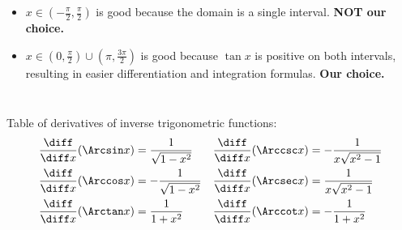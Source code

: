 \begin{frame}
\begin{columns}
\begin{itemize}
\item<6-> $x\in \left(-\frac{\pi}{2}, \frac{\pi}{2} \right) $ is good because the domain is a single interval. \textbf{NOT our choice.}

\item<7,8,9,10-> $x\in \left(0, \frac{\pi}{2} \right) \cup \left(\pi,\frac{3\pi}{2} \right) $ is  good because $\tan x$ is positive on both intervals, resulting in easier differentiation and integration formulas. \textbf{Our choice.} 

\end{itemize}
\end{columns}

\end{frame}

\begin{frame}
Table of derivatives of inverse trigonometric functions: 
\begin{align*}
\frac{\diff}{\diff x} (\Arcsin x) & = %
\frac{1}{\sqrt{1-x^2}} &%
\frac{\diff}{\diff x} (\Arccsc x) & = %
-\frac{1}{x\sqrt{x^2-1}} \\%
\frac{\diff}{\diff x} (\Arccos x) & = %
-\frac{1}{\sqrt{1-x^2}} &%
\frac{\diff}{\diff x} (\Arcsec x) & = %
\frac{1}{x\sqrt{x^2-1}} \\%
\frac{\diff}{\diff x} (\Arctan x) & = %
\frac{1}{1+x^2} &%
\frac{\diff}{\diff x} (\Arccot x) & = %
-\frac{1}{1+x^2} %
\end{align*}
\end{frame}

